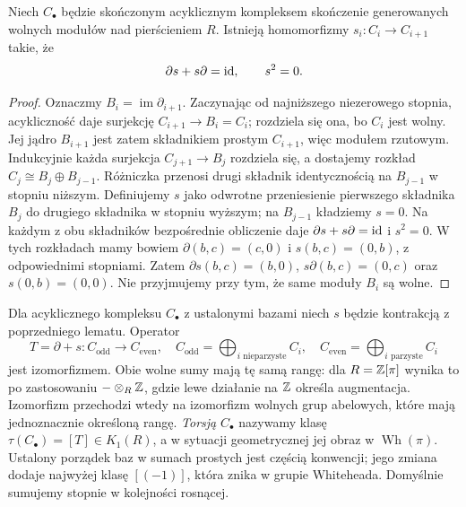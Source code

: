 \begin{lemat}
\label{lem:kontrakcja-20}
Niech $C_\bullet$ będzie skończonym acyklicznym
kompleksem skończenie generowanych wolnych modułów
nad pierścieniem $R$. Istnieją homomorfizmy
$s_i:C_i\to C_{i+1}$ takie, że
\[
 \partial s+s\partial=\mathrm{id},
 \qquad s^2=0.
\]
\end{lemat}
\begin{proof}
Oznaczmy $B_i=\operatorname{im}\partial_{i+1}$.
Zaczynając od najniższego niezerowego stopnia,
acykliczność daje surjekcję $C_{i+1}\to B_i=C_i$;
rozdziela się ona, bo $C_i$ jest wolny.
Jej jądro $B_{i+1}$ jest zatem składnikiem prostym
$C_{i+1}$, więc modułem rzutowym. Indukcyjnie
każda surjekcja $C_{j+1}\to B_j$ rozdziela się,
a dostajemy rozkład
$C_j\cong B_j\oplus B_{j-1}$.
Różniczka przenosi drugi składnik identycznością
na $B_{j-1}$ w stopniu niższym. Definiujemy $s$
jako odwrotne przeniesienie pierwszego składnika
$B_j$ do drugiego składnika w stopniu wyższym;
na $B_{j-1}$ kładziemy $s=0$.
Na każdym z obu składników bezpośrednie obliczenie
daje $\partial s+s\partial=\mathrm{id}$ i $s^2=0$.
W tych rozkładach mamy bowiem
$\partial(b,c)=(c,0)$ i $s(b,c)=(0,b)$, z odpowiednimi
stopniami. Zatem $\partial s(b,c)=(b,0)$,
$s\partial(b,c)=(0,c)$ oraz $s(0,b)=(0,0)$.
Nie przyjmujemy przy tym, że same moduły $B_i$ są wolne.
\end{proof}

\begin{definicja}
\label{def:torsja-kompleksu-20}
Dla acyklicznego kompleksu $C_\bullet$ z ustalonymi
bazami niech $s$ będzie kontrakcją z poprzedniego
lematu. Operator
\[
 T=\partial+s:C_{\mathrm{odd}}\longrightarrow
 C_{\mathrm{even}},\quad
 C_{\mathrm{odd}}=\bigoplus_{i\text{ nieparzyste}}C_i,
 \quad C_{\mathrm{even}}=\bigoplus_{i\text{ parzyste}}C_i
\]
jest izomorfizmem. Obie wolne sumy mają tę samą rangę:
dla $R=\mathbb{Z}[\pi]$ wynika to po zastosowaniu
$-\otimes_R\mathbb{Z}$, gdzie lewe działanie na $\mathbb{Z}$ określa augmentacja.
Izomorfizm przechodzi wtedy na izomorfizm wolnych grup abelowych,
które mają jednoznacznie określoną rangę.
\emph{Torsją} $C_\bullet$
nazywamy klasę $\tau(C_\bullet)=[T]\in K_1(R)$,
a w sytuacji geometrycznej jej obraz w
$\operatorname{Wh}(\pi)$. Ustalony porządek baz
w sumach prostych jest częścią konwencji; jego
zmiana dodaje najwyżej klasę $[(-1)]$, która znika
w grupie Whiteheada. Domyślnie sumujemy stopnie w kolejności rosnącej.
\end{definicja}

